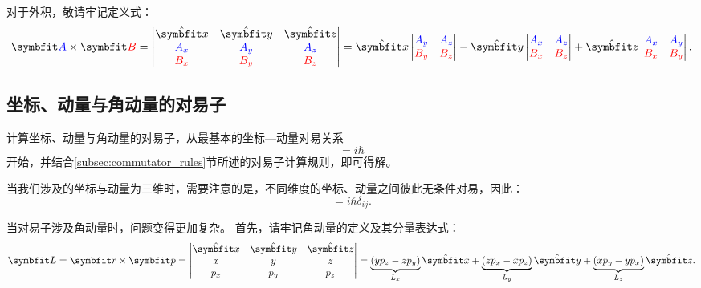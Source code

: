 对于外积，敬请牢记定义式：
\begin{equation}
    \bm{\blue{A}}\times\bm{\red{B}} =
    \begin{vmatrix}
        \hat{\bm{x}} & \hat{\bm{y}} & \hat{\bm{z}} \\
        \blue{A_x} & \blue{A_y} & \blue{A_z} \\
        \red{B_x} & \red{B_y} & \red{B_z}
    \end{vmatrix}
    = \hat{\bm{x}}\begin{vmatrix}\blue{A_y} & \blue{A_z} \\ \red{B_y} & \red{B_z}\end{vmatrix}
     -\hat{\bm{y}}\begin{vmatrix}\blue{A_x} & \blue{A_z} \\ \red{B_x} & \red{B_z}\end{vmatrix}
     +\hat{\bm{z}}\begin{vmatrix}\blue{A_x} & \blue{A_y} \\ \red{B_x} & \red{B_y}\end{vmatrix}.
\end{equation}


\subsection{坐标、动量与角动量的对易子}
\label{subsec:commutator_rpL}

计算坐标、动量与角动量的对易子，从最基本的坐标—动量对易关系
\begin{equation}
    [x, p] = i \hbar
\end{equation}
开始，并结合\ref{subsec:commutator_rules}节所述的对易子计算规则，即可得解。

当我们涉及的坐标与动量为三维时，需要注意的是，不同维度的坐标、动量之间彼此无条件对易，因此：
\begin{equation}
    [r_i, p_j] = i \hbar \delta_{ij}.
\end{equation}

当对易子涉及角动量时，问题变得更加复杂。
首先，请牢记角动量的定义及其分量表达式：
\begin{equation}
    \LL = \rr\times\pp =
    \begin{vmatrix}
        \hat{\bm{x}} & \hat{\bm{y}} & \hat{\bm{z}} \\
        x & y & z \\
        p_x & p_y & p_z \\
    \end{vmatrix}
    = \underbrace{(y p_z - z p_y)}_{L_x} \hat{\bm{x}} + \underbrace{(z p_x - x p_z)}_{L_y} \hat{\bm{y}} + \underbrace{(x p_y - y p_x)}_{L_z} \hat{\bm{z}}.
\end{equation}

